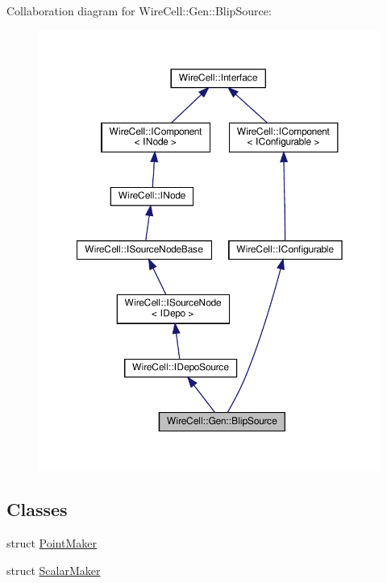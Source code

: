 Collaboration diagram for Wire\+Cell\+:\+:Gen\+:\+:Blip\+Source\+:
\nopagebreak
\begin{figure}[H]
\begin{center}
\leavevmode
\includegraphics[width=350pt]{class_wire_cell_1_1_gen_1_1_blip_source__coll__graph}
\end{center}
\end{figure}
\subsection*{Classes}
\begin{DoxyCompactItemize}
\item 
struct \hyperlink{struct_wire_cell_1_1_gen_1_1_blip_source_1_1_point_maker}{Point\+Maker}
\item 
struct \hyperlink{struct_wire_cell_1_1_gen_1_1_blip_source_1_1_scalar_maker}{Scalar\+Maker}
\end{DoxyCompactItemize}
